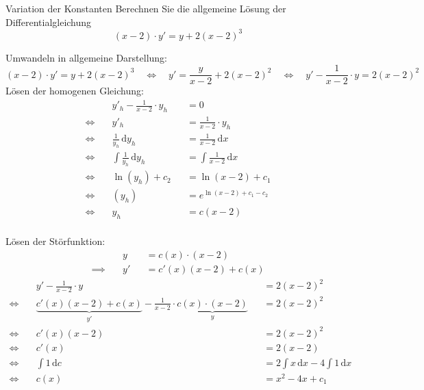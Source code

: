 \documentclass[german]{../spicker}
\renewcommand{\d}{\,\mathrm{d}}
\begin{document}
\begin{example}{Variation der Konstanten}
    Berechnen Sie die allgemeine Lösung der Differentialgleichung
    $$
        (x-2) \cdot y' = y + 2(x-2)^3
    $$
    \noindent\makebox[\linewidth]{\rule{\textwidth}{1pt}}

    Umwandeln in allgemeine Darstellung:
    $$
        (x-2) \cdot y' = y + 2(x-2)^3 \quad \iff \quad y' = \frac{y}{x-2} + 2(x-2)^2 \quad \iff \quad y' - \frac{1}{x-2}\cdot y = 2(x-2)^2
    $$
    Lösen der homogenen Gleichung:
    $$
        \begin{aligned}
                       & y'_h - \frac{1}{x-2}\cdot y_h &  & = 0                         \\
            \iff \quad & y'_h                          &  & = \frac{1}{x-2}\cdot y_h    \\
            \iff \quad & \frac{1}{y_h} \d y_h          &  & = \frac{1}{x-2}\d x         \\
            \iff \quad & \int \frac{1}{y_h} \d y_h     &  & = \int \frac{1}{x-2}\d x    \\
            \iff \quad & \ln(y_h) + c_2                &  & = \ln (x-2) + c_1           \\
            \iff \quad & (y_h)                         &  & = e^{\ln (x-2) + c_1 - c_2} \\
            \iff \quad & y_h                           &  & = c(x-2)                    \\
        \end{aligned}
    $$

    Lösen der Störfunktion:
    $$
        \begin{aligned}
                           & y  &  & = c(x) \cdot (x-2)  \\
            \implies \quad & y' &  & = c'(x)(x-2) + c(x)
        \end{aligned}
    $$
    $$
        \begin{aligned}
                       & y' - \frac{1}{x-2}\cdot y                                                                  &  & = 2(x-2)^2                   \\
            \iff \quad & \underbrace{c'(x)(x-2) + c(x)}_{y'} - \frac{1}{x-2}\cdot \underbrace{c(x) \cdot (x-2)}_{y} &  & = 2(x-2)^2                   \\
            \iff \quad & c'(x)(x-2)                                                                                 &  & = 2(x-2)^2                   \\
            \iff \quad & c'(x)                                                                                      &  & = 2(x-2)                     \\
            \iff \quad & \int 1 \d c                                                                                &  & = 2\int x\d x - 4\int 1 \d x \\
            \iff \quad & c(x)                                                                                       &  & = x^2 - 4x + c_1
        \end{aligned}
    $$


\end{example}
\end{document}
